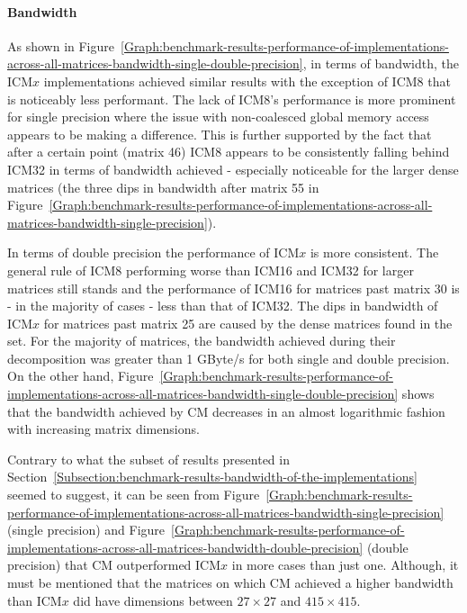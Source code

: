 \paragraph{Bandwidth} As shown in Figure~\ref{Graph:benchmark-results-performance-of-implementations-across-all-matrices-bandwidth-single-double-precision}, in terms of bandwidth, the ICM$ x $ implementations achieved similar results with the exception of ICM8 that is noticeably less performant. The lack of ICM8's performance is more prominent for single precision where the issue with non-coalesced global memory access appears to be making a difference. This is further supported by the fact that after a certain point (matrix 46) ICM8 appears to be consistently falling behind ICM32 in terms of bandwidth achieved - especially noticeable for the larger dense matrices (the three dips in bandwidth after matrix 55 in Figure~\ref{Graph:benchmark-results-performance-of-implementations-across-all-matrices-bandwidth-single-precision}).
\par In terms of double precision the performance of ICM$ x $ is more consistent. The general rule of ICM8 performing worse than ICM16 and ICM32 for larger matrices still stands and the performance of ICM16 for matrices past matrix 30 is - in the majority of cases - less than that of ICM32. The dips in bandwidth of ICM$ x $ for matrices past matrix 25 are caused by the dense matrices found in the set. For the majority of matrices, the bandwidth achieved during their decomposition was greater than 1 GByte/s for both single and double precision. On the other hand, Figure~\ref{Graph:benchmark-results-performance-of-implementations-across-all-matrices-bandwidth-single-double-precision} shows that the bandwidth achieved by CM decreases in an almost logarithmic fashion with increasing matrix dimensions.
\par Contrary to what the subset of results presented in Section~\ref{Subsection:benchmark-results-bandwidth-of-the-implementations} seemed to suggest, it can be seen from Figure~\ref{Graph:benchmark-results-performance-of-implementations-across-all-matrices-bandwidth-single-precision} (single precision) and Figure~\ref{Graph:benchmark-results-performance-of-implementations-across-all-matrices-bandwidth-double-precision} (double precision) that CM outperformed ICM$ x $ in more cases than just one. Although, it must be mentioned that the matrices on which CM achieved a higher bandwidth than ICM$ x $ did have dimensions between $ 27\times 27 $ and $ 415\times 415 $.

